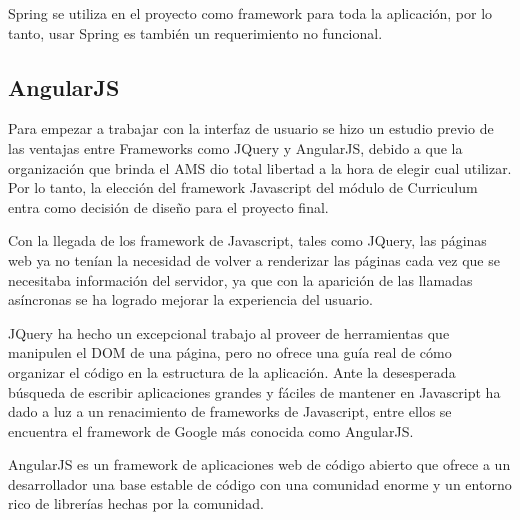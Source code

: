 Spring se utiliza en el proyecto como framework para toda la aplicación, por lo tanto, usar Spring es también un requerimiento no funcional.

\subsection{AngularJS}
Para empezar a trabajar con la interfaz de usuario se hizo un estudio previo de las ventajas entre Frameworks como JQuery y AngularJS, debido a que la organización que brinda el AMS dio total libertad a la hora de elegir cual utilizar. Por lo tanto, la elección del framework Javascript del módulo de Curriculum entra como decisión de diseño para el proyecto final. 

Con la llegada de los framework de Javascript, tales como JQuery, las páginas web ya no tenían la necesidad de volver a renderizar las páginas cada vez que se necesitaba información del servidor, ya que con la aparición de las llamadas asíncronas se ha logrado mejorar la experiencia del usuario\citep{ruebbelke2015angularjs}.

JQuery ha hecho un excepcional trabajo al proveer de herramientas que manipulen el DOM de una página, pero no ofrece una guía real de cómo organizar el código en la estructura de la aplicación. Ante la desesperada búsqueda de escribir aplicaciones grandes y fáciles de mantener en Javascript ha dado a luz a un renacimiento de frameworks de Javascript, entre ellos se encuentra el framework de Google más conocida como AngularJS.

AngularJS es un framework de aplicaciones web de código abierto que ofrece a un desarrollador una base estable de código con una comunidad enorme y un entorno rico de librerías hechas por la comunidad\citep{darwin2013angularjs}.